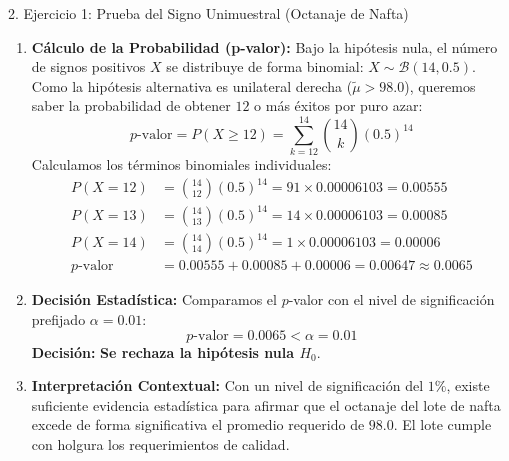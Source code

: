 \documentclass[11pt,a4paper]{article}
\begin{document}
\begin{subsection}{2. Ejercicio 1: Prueba del Signo Unimuestral (Octanaje de Nafta)}
\begin{enumerate}
\begin{itemize}
              \end{itemize}
              Por lo tanto, la muestra efectiva se reduce a \textbf{$n = 14$} observaciones (eliminando el empate).
              Contamos la cantidad de signos positivos: \textbf{$x = 12$}.
              La cadena de signos resultante es:
              \[ + \quad + \quad + \quad + \quad + \quad - \quad + \quad + \quad + \quad - \quad + \quad + \quad + \quad + \]
        \item \textbf{Cálculo de la Probabilidad (p-valor):}
              Bajo la hipótesis nula, el número de signos positivos $X$ se distribuye de forma binomial: $X \sim \mathcal{B}(14, 0.5)$.
              Como la hipótesis alternativa es unilateral derecha ($\tilde{\mu} > 98.0$), queremos saber la probabilidad de obtener $12$ o más éxitos por puro azar:
              \[ p\text{-valor} = P(X \ge 12) = \sum_{k=12}^{14} \binom{14}{k} (0.5)^{14} \]
              Calculamos los términos binomiales individuales:
              \begin{align*}
                  P(X = 12) &= \binom{14}{12} (0.5)^{14} = 91 \times 0.00006103 = 0.00555 \\
                  P(X = 13) &= \binom{14}{13} (0.5)^{14} = 14 \times 0.00006103 = 0.00085 \\
                  P(X = 14) &= \binom{14}{14} (0.5)^{14} = 1 \times 0.00006103 = 0.00006 \\
                  p\text{-valor} &= 0.00555 + 0.00085 + 0.00006 = 0.00647 \approx \mathbf{0.0065}
              \end{align*}
        \item \textbf{Decisión Estadística:}
              Comparamos el $p$-valor con el nivel de significación prefijado $\alpha = 0.01$:
              \[ p\text{-valor} = 0.0065 < \alpha = 0.01 \]
              \textbf{Decisión:} \textbf{Se rechaza la hipótesis nula $H_0$}.
        \item \textbf{Interpretación Contextual:}
              Con un nivel de significación del $1\%$, existe suficiente evidencia estadística para afirmar que el octanaje del lote de nafta excede de forma significativa el promedio requerido de $98.0$. El lote cumple con holgura los requerimientos de calidad.
    \end{enumerate}
\end{subsection}
\end{document}
